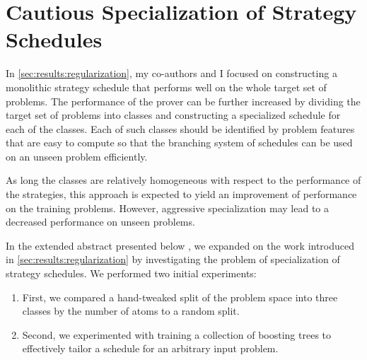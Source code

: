 \section{Cautious Specialization of Strategy Schedules}
\label{sec:results:cautious}

In \cref{sec:results:regularization},
my co-authors and I focused on constructing a monolithic strategy schedule that performs well on the whole target set of problems.
The performance of the prover can be further increased by dividing the target set of problems into classes
and constructing a specialized schedule for each of the classes.
Each of such classes should be identified by problem features that are easy to compute
so that the branching system of schedules can be used on an unseen problem efficiently.

As long the classes are relatively homogeneous with respect to the performance of the strategies,
this approach is expected to yield an improvement of performance on the training problems.
However, aggressive specialization may lead to a decreased performance on unseen problems.

In the extended abstract presented below \cite{DBLP:conf/paar/BartekC024},
we expanded on the work introduced in \cref{sec:results:regularization}
by investigating the problem of specialization of strategy schedules.
We performed two initial experiments:
\begin{enumerate}
\item First, we compared a hand-tweaked split of the problem space into three classes by the number of atoms to a random split.
\item Second, we experimented with training a collection of boosting trees to effectively tailor a schedule for an arbitrary input problem.
\end{enumerate}


